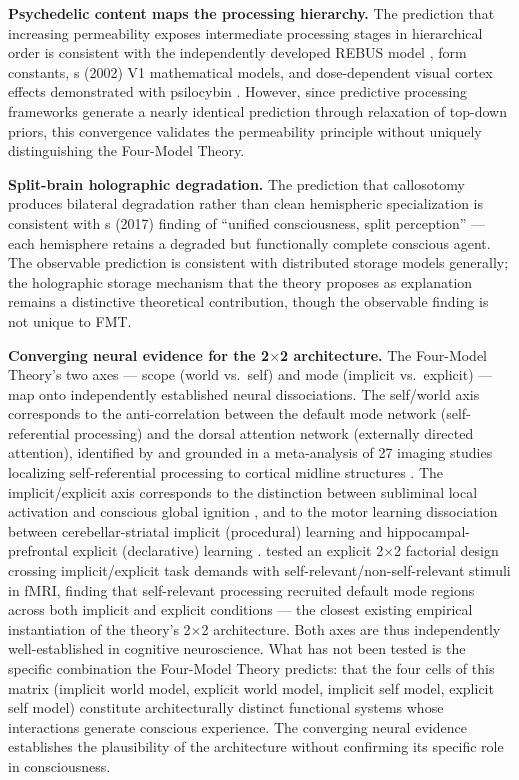 \documentclass[12pt]{article}
\begin{document}
\textbf{Psychedelic content maps the processing hierarchy.} The prediction that increasing permeability exposes intermediate processing stages in hierarchical order is consistent with the independently developed REBUS model \citep{CarhartHarris2019}, \citet{Kluver1966} form constants, \citeauthor{Bressloff2002}\textquotesingle s (2002) V1 mathematical models, and dose-dependent visual cortex effects demonstrated with psilocybin \citep{Timmermann2023}. However, since predictive processing frameworks generate a nearly identical prediction through relaxation of top-down priors, this convergence validates the permeability principle without uniquely distinguishing the Four-Model Theory.

\textbf{Split-brain holographic degradation.} The prediction that callosotomy produces bilateral degradation rather than clean hemispheric specialization is consistent with \citeauthor{Pinto2017}\textquotesingle s (2017) finding of ``unified consciousness, split perception'' --- each hemisphere retains a degraded but functionally complete conscious agent. The observable prediction is consistent with distributed storage models generally; the holographic storage mechanism that the theory proposes as explanation remains a distinctive theoretical contribution, though the observable finding is not unique to FMT.

\textbf{Converging neural evidence for the 2$\times$2 architecture.} The Four-Model Theory's two axes --- scope (world vs.\ self) and mode (implicit vs.\ explicit) --- map onto independently established neural dissociations. The self/world axis corresponds to the anti-correlation between the default mode network (self-referential processing) and the dorsal attention network (externally directed attention), identified by \citet{Fox2005} and grounded in a meta-analysis of 27 imaging studies localizing self-referential processing to cortical midline structures \citep{Northoff2006}. The implicit/explicit axis corresponds to the distinction between subliminal local activation and conscious global ignition \citep{Dehaene2001}, and to the motor learning dissociation between cerebellar-striatal implicit (procedural) learning and hippocampal-prefrontal explicit (declarative) learning \citep{Doyon2003}. \citet{Rameson2010} tested an explicit 2$\times$2 factorial design crossing implicit/explicit task demands with self-relevant/non-self-relevant stimuli in fMRI, finding that self-relevant processing recruited default mode regions across both implicit and explicit conditions --- the closest existing empirical instantiation of the theory's 2$\times$2 architecture. Both axes are thus independently well-established in cognitive neuroscience. What has not been tested is the specific combination the Four-Model Theory predicts: that the four cells of this matrix (implicit world model, explicit world model, implicit self model, explicit self model) constitute architecturally distinct functional systems whose interactions generate conscious experience. The converging neural evidence establishes the plausibility of the architecture without confirming its specific role in consciousness.
\end{document}
